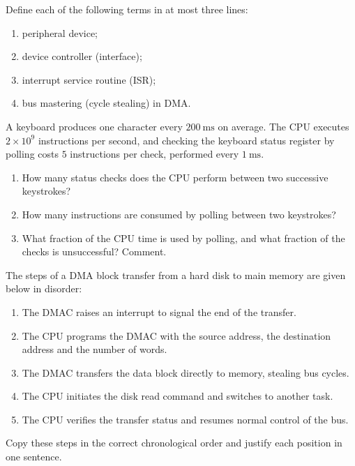 \documentclass[11pt]{article}
\newcounter{popsec}
\newcounter{popsub}
\newcommand{\courssub}[1]{%
  \stepcounter{popsub}%
  \par\vspace{9pt}\noindent{\popxbold\fontsize{11.5}{13}\selectfont\color{popink}{\color{poporange}\thepopsec.\thepopsub}\hspace{6pt}#1}\par\nopagebreak\vspace{4pt}
}
\begin{document}
\begin{exercice}[Definitions]
Define each of the following terms in at most three lines:
\begin{enumerate}
\item peripheral device;
\item device controller (interface);
\item interrupt service routine (ISR);
\item bus mastering (cycle stealing) in DMA.
\end{enumerate}
\end{exercice}

\begin{exercice}
A keyboard produces one character every $200\ \mathrm{ms}$ on average. The CPU executes $2 \times 10^{9}$ instructions per second, and checking the keyboard status register by polling costs $5$ instructions per check, performed every $1\ \mathrm{ms}$.
\begin{enumerate}
\item How many status checks does the CPU perform between two successive keystrokes?
\item How many instructions are consumed by polling between two keystrokes?
\item What fraction of the CPU time is used by polling, and what fraction of the checks is unsuccessful? Comment.
\end{enumerate}
\end{exercice}

\courssub{I practise}

\begin{exercice}
The steps of a DMA block transfer from a hard disk to main memory are given below in disorder:
\begin{enumerate}
\item[a.] The DMAC raises an interrupt to signal the end of the transfer.
\item[b.] The CPU programs the DMAC with the source address, the destination address and the number of words.
\item[c.] The DMAC transfers the data block directly to memory, stealing bus cycles.
\item[d.] The CPU initiates the disk read command and switches to another task.
\item[e.] The CPU verifies the transfer status and resumes normal control of the bus.
\end{enumerate}
Copy these steps in the correct chronological order and justify each position in one sentence.
\end{exercice}
\end{document}
